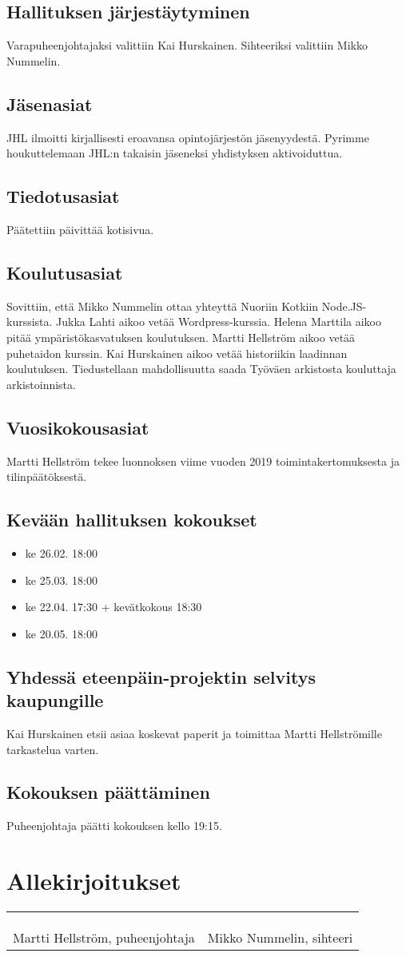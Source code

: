 \documentclass[a4paper]{amsart}
\begin{document}
\subsection{Hallituksen järjestäytyminen}
Varapuheenjohtajaksi valittiin Kai Hurskainen. Sihteeriksi valittiin Mikko Nummelin.
\subsection{Jäsenasiat}
JHL ilmoitti kirjallisesti eroavansa opintojärjestön jäsenyydestä. Pyrimme houkuttelemaan JHL:n takaisin jäseneksi yhdistyksen aktivoiduttua.
\subsection{Tiedotusasiat}
Päätettiin päivittää kotisivua.
\subsection{Koulutusasiat}
Sovittiin, että Mikko Nummelin ottaa yhteyttä Nuoriin Kotkiin Node.JS-kurssista. Jukka Lahti aikoo vetää Wordpress-kurssia. Helena Marttila aikoo pitää ympäristökasvatuksen koulutuksen. Martti Hellström aikoo vetää puhetaidon kurssin. Kai Hurskainen aikoo vetää historiikin laadinnan koulutuksen. Tiedustellaan mahdollisuutta saada Työväen arkistosta kouluttaja arkistoinnista.
\subsection{Vuosikokousasiat}
Martti Hellström tekee luonnoksen viime vuoden 2019 toimintakertomuksesta ja tilinpäätöksestä.
\subsection{Kevään hallituksen kokoukset}
\begin{itemize}
\item ke 26.02. 18:00 \\
\item ke 25.03. 18:00 \\
\item ke 22.04. 17:30 + kevätkokous 18:30 \\
\item ke 20.05. 18:00
\end{itemize}
\subsection{Yhdessä eteenpäin-projektin selvitys kaupungille}
Kai Hurskainen etsii asiaa koskevat paperit ja toimittaa Martti Hellströmille tarkastelua varten.
\subsection{Kokouksen päättäminen}
Puheenjohtaja päätti kokouksen kello 19:15.
\section*{Allekirjoitukset}
\begin{flushleft}
\begin{tabular}{ll}
& \\
& \\
& \\
Martti Hellström, puheenjohtaja &
Mikko Nummelin, sihteeri 
\end{tabular}
\end{flushleft}
\end{document}
